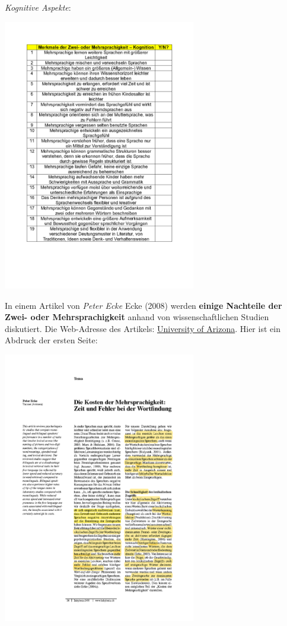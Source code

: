 \documentclass[
  letterpaper,
]{scrbook}
\begin{document}
\emph{Kognitive Aspekte}:

\includegraphics[width=3.31in,height=\textheight]{./pictures/Mehrsprachigkeit_Behauptungen_Page3.png}

In einem Artikel von \emph{Peter Ecke} Ecke (2008) werden \textbf{einige
Nachteile der Zwei- oder Mehrsprachigkeit} anhand von wissenschaftlichen
Studien diskutiert. Die Web-Adresse des Artikels:
\href{http://www.u.arizona.edu/~eckep/Ecke\%2008\%20Kosten\%20der\%20MS.pdf}{University
of Arizona}. Hier ist ein Abdruck der ersten Seite:

\includegraphics[width=3.31in,height=\textheight]{./pictures/TOT_bilangual_baby2_08ecke_annotated_Page1.png}
\end{document}
